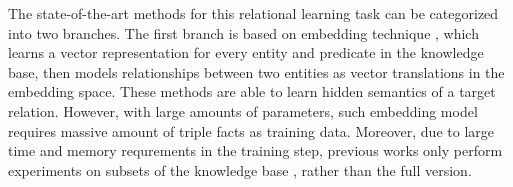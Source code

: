 
The state-of-the-art methods for this relational learning
task can be categorized into two branches.
The first branch is based on embedding technique
\cite{bordes2013translating,wang2014knowledge,guo2016jointly,wang2016text}
,
which learns a vector representation for every entity and predicate in 
the knowledge base, then models relationships between two entities 
as vector translations in the embedding space.
These methods are able to learn hidden semantics of a target relation. 
However, with large amounts of parameters, such embedding model 
requires massive amount of triple facts as training data.
Moreover, due to large time and memory requrements in the training step,
previous works only perform experiments on subsets of the knowledge base
\cite{bordes2013translating,guo2016jointly},
rather than the full version.

